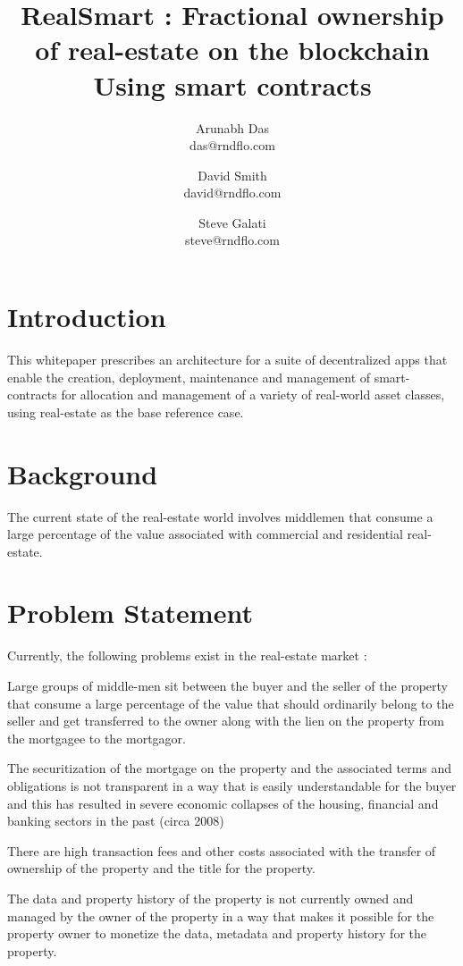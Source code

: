 \documentclass{article}
\author{Arunabh Das \\ {das@rndflo.com}
   \and David Smith \\ {david@rndflo.com} 
   \and Steve Galati \\ {steve@rndflo.com} }
\title{RealSmart : Fractional ownership of real-estate on the blockchain Using smart contracts}
\date{\vspace{-5ex}}
\begin{document}
\maketitle

\section{Introduction}


This whitepaper prescribes an architecture for a suite of decentralized apps that enable the creation, 
deployment, maintenance and management of smart-contracts for allocation and management of a variety 
of real-world asset classes, using real-estate as the base reference case.




\section{Background}


The current state of the real-estate world involves middlemen that consume a large percentage of the 
value associated with commercial and residential real-estate.

\section{Problem Statement}


Currently, the following problems exist in the real-estate market :

Large groups of middle-men sit between the buyer and the seller of the property that consume a large 
percentage of the value that should ordinarily belong to the seller and get transferred to the owner 
along with the lien on the property from the mortgagee to the mortgagor.


The securitization of the mortgage on the property and the associated terms and obligations is not 
transparent in a way that is easily understandable for the buyer and this has resulted in severe 
economic collapses of the housing, financial and banking sectors in the past (circa 2008)


There are high transaction fees and other costs associated with the transfer of ownership of the property 
and the title for the property.


The data and property history of the property is not currently owned and managed by the owner of the 
property in a way that makes it possible for the property owner to monetize the data, metadata and property history for the property.
\end{document}
